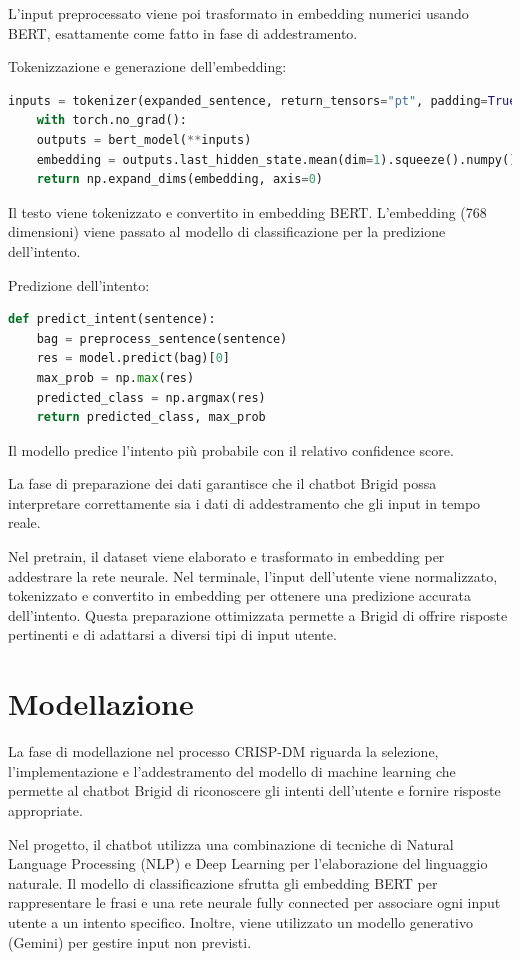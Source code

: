 \documentclass[12pt, letterpaper]{article}
\begin{document}
L'input preprocessato viene poi trasformato in embedding numerici usando BERT, esattamente come fatto in fase di addestramento.

Tokenizzazione e generazione dell'embedding:

\begin{lstlisting}[language=Python]
	inputs = tokenizer(expanded_sentence, return_tensors="pt", padding=True, truncation=True, max_length=50)
	with torch.no_grad():
	outputs = bert_model(**inputs)
	embedding = outputs.last_hidden_state.mean(dim=1).squeeze().numpy()
	return np.expand_dims(embedding, axis=0)
\end{lstlisting}

Il testo viene tokenizzato e convertito in embedding BERT. L’embedding (768 dimensioni) viene passato al modello di classificazione per la predizione dell’intento.

Predizione dell’intento:

\begin{lstlisting}[language=Python]
	def predict_intent(sentence):
	bag = preprocess_sentence(sentence)
	res = model.predict(bag)[0]
	max_prob = np.max(res)
	predicted_class = np.argmax(res)
	return predicted_class, max_prob
\end{lstlisting}

Il modello predice l’intento più probabile con il relativo confidence score.

La fase di preparazione dei dati garantisce che il chatbot Brigid possa interpretare correttamente sia i dati di addestramento che gli input in tempo reale.

Nel pretrain, il dataset viene elaborato e trasformato in embedding per addestrare la rete neurale. Nel terminale, l’input dell’utente viene normalizzato, tokenizzato e convertito in embedding per ottenere una predizione accurata dell’intento. Questa preparazione ottimizzata permette a Brigid di offrire risposte pertinenti e di adattarsi a diversi tipi di input utente.


\section{Modellazione}
La fase di modellazione nel processo CRISP-DM riguarda la selezione, l'implementazione e l'addestramento del modello di machine learning che permette al chatbot Brigid di riconoscere gli intenti dell'utente e fornire risposte appropriate.

Nel progetto, il chatbot utilizza una combinazione di tecniche di Natural Language Processing (NLP) e Deep Learning per l'elaborazione del linguaggio naturale. Il modello di classificazione sfrutta gli embedding BERT per rappresentare le frasi e una rete neurale fully connected per associare ogni input utente a un intento specifico. Inoltre, viene utilizzato un modello generativo (Gemini) per gestire input non previsti.
\end{document}
